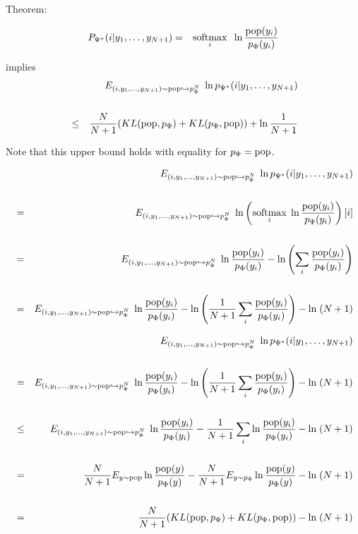 {


{\color{red} Theorem:}

\begin{eqnarray*}
P_{\Psi^*}(i|y_1,\ldots,y_{N+1}) & = & \operatorname*{softmax}_i\;\; \ln \frac{\mathrm{pop}(y_i)}{p_\Phi(y_i)}
\end{eqnarray*}

\vfill
{\color{red} implies}
\begin{eqnarray*}
  && E_{(i,y_1,\dots,y_{N+1}) \sim \mathrm{pop}\hookrightarrow p_\Phi^N}\;\ln p_{\Psi^*}(i|y_1,\ldots,y_{N+1}) \\
  \\
  & \leq & \frac{N}{N+1}(KL(\mathrm{pop},p_\Phi) + KL(p_\Phi,\mathrm{pop})) + \ln \frac{1}{N+1}
\end{eqnarray*}

\vfill
Note that this upper bound holds with equality for $p_\Phi = \mathrm{pop}$.


{\huge
 \begin{eqnarray*}
    & & E_{(i,y_1,\ldots,y_{N+1}) \sim \mathrm{pop} \hookrightarrow p_\Phi^N}\;\ln p_{\Psi^*}(i|y_1,\ldots,y_{N+1}) \\
    \\
    & = & E_{(i,y_1,\ldots,y_{N+1}) \sim \mathrm{pop}\hookrightarrow p_\Phi^N}\;\ln \left(\operatorname*{softmax}_i \;\ln \frac{\mathrm{pop}(y_i)}{p_\Phi(y_i)}\right)[i] \\
    \\
    & = & E_{(i,y_1,\ldots,y_{N+1}) \sim \mathrm{pop}\hookrightarrow p_\Phi^N}\;\ln\frac{\mathrm{pop}(y_i)}{p_\Phi(y_i)} - \ln\left(\sum_i \frac{\mathrm{pop}(y_i)}{p_\Phi(y_i)} \right) \\
    \\
    & = & E_{(i,y_1,\ldots,y_{N+1}) \sim \mathrm{pop}\hookrightarrow p_\Phi^N}\;\ln\frac{\mathrm{pop}(y_i)}{p_\Phi(y_i)} - \ln\left(\frac{1}{N+1}\sum_i \frac{\mathrm{pop}(y_i)}{p_\Phi(y_i)} \right) - \ln\;(N+1)
  \end{eqnarray*}
}

{\huge
 \begin{eqnarray*}
    & & E_{(i,y_1,\ldots,y_{N+1}) \sim \mathrm{pop} \hookrightarrow p_\Phi^N}\;\ln p_{\Psi^*}(i|y_1,\ldots,y_{N+1}) \\
    \\
    & = & E_{(i,y_1,\ldots,y_{N+1}) \sim \mathrm{pop}\hookrightarrow p_\Phi^N}\;\ln\frac{\mathrm{pop}(y_i)}{p_\Phi(y_i)} - \ln\left(\frac{1}{N+1}\sum_i \frac{\mathrm{pop}(y_i)}{p_\Phi(y_i)} \right) - \ln\;(N+1) \\
    \\
    & \leq & E_{(i,y_1,\ldots,y_{N+1}) \sim \mathrm{pop}\hookrightarrow p_\Phi^N}\;\ln\frac{\mathrm{pop}(y_i)}{p_\Phi(y_i)} - \frac{1}{N+1} \sum_i \ln\frac{\mathrm{pop}(y_i)}{p_\Phi(y_i)} - \ln\;(N+1) \\
    \\
    & = & \frac{N}{N+1} E_{y \sim \mathrm{pop}} \ln \frac{\mathrm{pop}(y)}{p_\Phi(y)} - \frac{N}{N+1} E_{y \sim p_\Phi} \ln \frac{\mathrm{pop}(y)}{p_\Phi(y)} - \ln\;(N+1) \\
    \\
    & = & \frac{N}{N+1}(KL(\mathrm{pop},p_\Phi) + KL(p_\Phi,\mathrm{pop})) - \ln\;(N+1) \\
  \end{eqnarray*}
}

}
